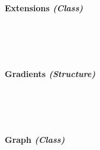 \begin{FlushLeft}
\begin{enumerate}
    \bk

    \paragraph{Extensions \textit{(Class)}} \mbox{} \\

    \begin{figure}[H]
        \centering
    \end{figure}\\

    \bk

    \paragraph{Gradients \textit{(Structure)}} \mbox{} \\

    \begin{figure}[H]
        \centering
    \end{figure}\\

    \bk


    \paragraph{Graph \textit{(Class)}} \mbox{} \\


\end{enumerate}
\end{FlushLeft}
